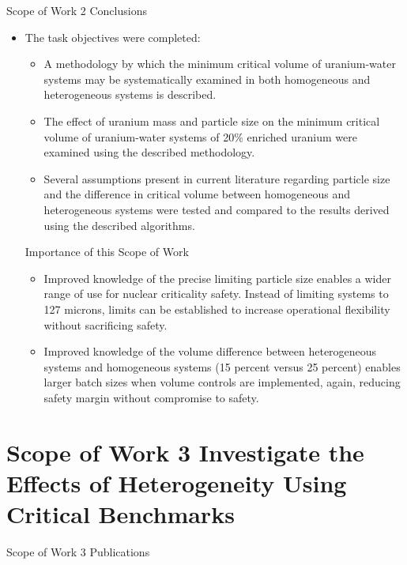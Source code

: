 \documentclass[10pt,aspectratio=169]{beamer}              %
\begin{document}
\begin{frame}{Scope of Work 2 Conclusions}
\begin{itemize}
    \item The task objectives were completed:
    \begin{itemize}
        \item A methodology by which the minimum critical volume of uranium-water systems may be systematically examined in both homogeneous and heterogeneous systems is described.
        \item The effect of uranium mass and particle size on the minimum critical volume of uranium-water systems of 20\% enriched uranium were examined using the described methodology.
        \item Several assumptions present in current literature regarding particle size and the difference in critical volume between homogeneous and heterogeneous systems were tested and compared to the results derived using the described algorithms.
    \end{itemize}
    \begin{alertblock}{Importance of this Scope of Work}
        \begin{itemize}
            \item Improved knowledge of the precise limiting particle size enables a wider range of use for nuclear criticality safety. Instead of limiting systems to 127 microns, limits can be established to increase operational flexibility without sacrificing safety.
            \item Improved knowledge of the volume difference between heterogeneous systems and homogeneous systems (15 percent versus 25 percent) enables larger batch sizes when volume controls are implemented, again, reducing safety margin without compromise to safety.
        \end{itemize}
    \end{alertblock}
\end{itemize}
    
\end{frame}

\section[Scope of Work 3]{Scope of Work 3 \textendash Investigate the Effects of Heterogeneity Using Critical Benchmarks}

\begin{frame}{Scope of Work 3 Publications}
    \begin{block}{}
        \textbf{}
    \end{block}    
    \begin{block}{}
        \textbf{}
    \end{block}
\end{frame}
\end{document}
